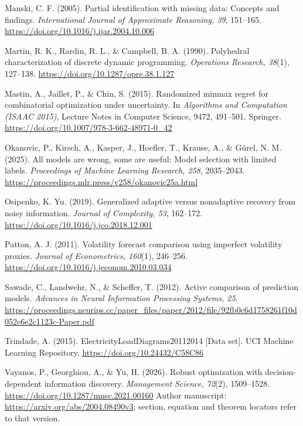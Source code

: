 Manski, C. F. (2005). Partial identification with missing data:
Concepts and findings. \emph{International Journal of Approximate
Reasoning, 39}, 151--165.
\url{https://doi.org/10.1016/j.ijar.2004.10.006}

Martin, R. K., Rardin, R. L., \& Campbell, B. A. (1990).
Polyhedral characterization of discrete dynamic programming.
\emph{Operations Research, 38}(1), 127--138.
\url{https://doi.org/10.1287/opre.38.1.127}

Mastin, A., Jaillet, P., \& Chin, S. (2015).
Randomized minmax regret for combinatorial optimization under uncertainty.
In \emph{Algorithms and Computation (ISAAC 2015)}, Lecture Notes in
Computer Science, 9472, 491--501. Springer.
\url{https://doi.org/10.1007/978-3-662-48971-0_42}

Okanovic, P., Kirsch, A., Kasper, J., Hoefler, T., Krause, A., \&
G\"urel, N. M. (2025). All models are wrong, some are useful:
Model selection with limited labels.
\emph{Proceedings of Machine Learning Research, 258}, 2035--2043.
\url{https://proceedings.mlr.press/v258/okanovic25a.html}

Osipenko, K. Yu. (2019). Generalized adaptive versus nonadaptive recovery
from noisy information. \emph{Journal of Complexity, 53}, 162--172.
\url{https://doi.org/10.1016/j.jco.2018.12.001}

Patton, A. J. (2011). Volatility forecast comparison using imperfect
volatility proxies. \emph{Journal of Econometrics, 160}(1), 246--256.
\url{https://doi.org/10.1016/j.jeconom.2010.03.034}

Sawade, C., Landwehr, N., \& Scheffer, T. (2012).
Active comparison of prediction models.
\emph{Advances in Neural Information Processing Systems, 25}.
\url{https://proceedings.neurips.cc/paper_files/paper/2012/file/92fb0c6d1758261f10d052e6e2c1123c-Paper.pdf}

Trindade, A. (2015). ElectricityLoadDiagrams20112014 [Data set].
UCI Machine Learning Repository.
\url{https://doi.org/10.24432/C58C86}

Vayanos, P., Georghiou, A., \& Yu, H. (2026).
Robust optimization with decision-dependent information discovery.
\emph{Management Science, 72}(2), 1509--1528.
\url{https://doi.org/10.1287/mnsc.2021.00160}
Author manuscript: \url{https://arxiv.org/abs/2004.08490v3};
section, equation and theorem locators refer to that version.


